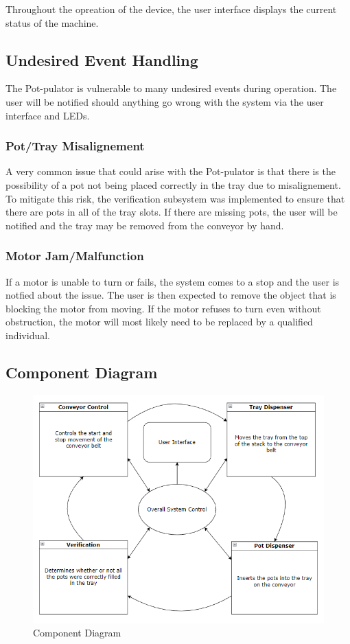 \documentclass[12pt, titlepage]{article}
\begin{document}
\noindent Throughout the opreation of the device, the user interface displays the current status of the machine.

\subsection{Undesired Event Handling}
The Pot-pulator is vulnerable to many undesired events during operation. The user will be notified should anything
go wrong with the system via the user interface and LEDs.
\subsubsection{Pot/Tray Misalignement}
A very common issue that could arise with the Pot-pulator is that there is the possibility
of a pot not being placed correctly in the tray due to misalignement. To mitigate this risk,
the verification subsystem was implemented to ensure that there are pots in all of the tray slots.
If there are missing pots, the user will be notified and the tray may be removed from the conveyor by hand.

\subsubsection{Motor Jam/Malfunction}
If a motor is unable to turn or fails, the system comes to a stop and the user is notfied about the issue.
The user is then expected to remove the object that is blocking the motor from moving. If the motor refuses to turn even without obstruction,
the motor will most likely need to be replaced by a qualified individual.


\subsection{Component Diagram}
\begin{figure}[H]
  \centering
  \includegraphics[width=\linewidth]{component_diagram.PNG}
  \caption{Component Diagram}
  \label{fig:componentdiagram}
\end{figure}
\end{document}
